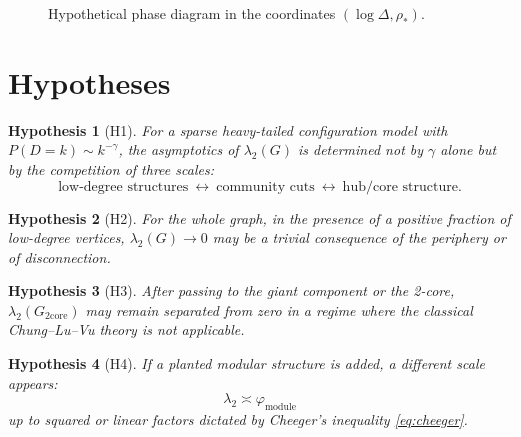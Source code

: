 \documentclass[11pt,a4paper]{article}
\theoremstyle{plain}
\newtheorem{hypothesis}{Hypothesis}
\theoremstyle{definition}
\theoremstyle{remark}
\newcommand{\core}{\mathrm{core}}
\newcommand{\Ph}{\varphi}
\newcommand{\lamtwo}{\lambda_2}
\newcommand{\Gtwo}{G_{2\core}}
\begin{document}
\begin{figure}[h]
\centering
{}
\caption{Hypothetical phase diagram in the coordinates
$(\log\Delta,\rho_*)$.}
\label{fig:phase}
\end{figure}

\section{Hypotheses}
\label{sec:hypotheses}

\begin{hypothesis}[H1]
For a sparse heavy-tailed configuration model with $P(D=k)\sim k^{-\gamma}$,
the asymptotics of $\lamtwo(G)$ is determined not by $\gamma$ alone but by the
competition of three scales:
\begin{equation}
\text{low-degree structures}\ \leftrightarrow\
\text{community cuts}\ \leftrightarrow\
\text{hub/core structure}.
\end{equation}
\end{hypothesis}

\begin{hypothesis}[H2]
For the whole graph, in the presence of a positive fraction of low-degree
vertices, $\lamtwo(G)\to 0$ may be a trivial consequence of the periphery or of
disconnection.
\end{hypothesis}

\begin{hypothesis}[H3]
After passing to the giant component or the 2-core, $\lamtwo(\Gtwo)$ may remain
separated from zero in a regime where the classical Chung--Lu--Vu theory
\cite{ChungLuVu2003} is not applicable.
\end{hypothesis}

\begin{hypothesis}[H4]
If a planted modular structure is added, a different scale appears:
\begin{equation}
\lamtwo\asymp\Ph_{\mathrm{module}}
\end{equation}
up to squared or linear factors dictated by Cheeger's inequality
\eqref{eq:cheeger}.
\end{hypothesis}
\end{document}
